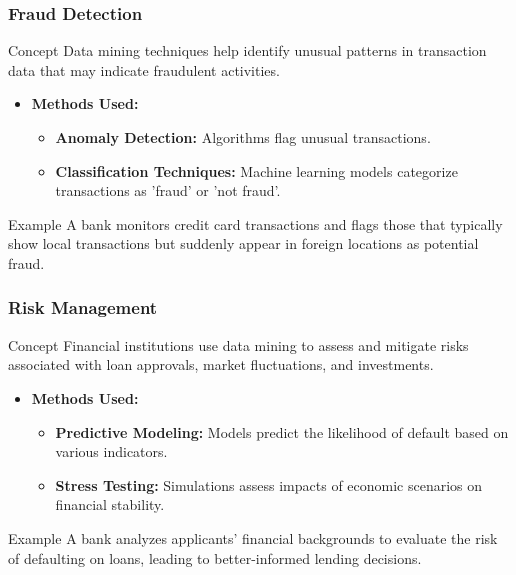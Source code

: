 \documentclass{beamer}
\begin{document}
\begin{frame}[fragile]
    \frametitle{Fraud Detection}
    \begin{block}{Concept}
        Data mining techniques help identify unusual patterns in transaction data that may indicate fraudulent activities.
    \end{block}
    \begin{itemize}
        \item \textbf{Methods Used:}
        \begin{itemize}
            \item \textbf{Anomaly Detection:} Algorithms flag unusual transactions.
            \item \textbf{Classification Techniques:} Machine learning models categorize transactions as 'fraud' or 'not fraud'.
        \end{itemize}
    \end{itemize}
    \begin{block}{Example}
        A bank monitors credit card transactions and flags those that typically show local transactions but suddenly appear in foreign locations as potential fraud.
    \end{block}
\end{frame}

\begin{frame}[fragile]
    \frametitle{Risk Management}
    \begin{block}{Concept}
        Financial institutions use data mining to assess and mitigate risks associated with loan approvals, market fluctuations, and investments.
    \end{block}
    \begin{itemize}
        \item \textbf{Methods Used:}
        \begin{itemize}
            \item \textbf{Predictive Modeling:} Models predict the likelihood of default based on various indicators.
            \item \textbf{Stress Testing:} Simulations assess impacts of economic scenarios on financial stability.
        \end{itemize}
    \end{itemize}
    \begin{block}{Example}
        A bank analyzes applicants' financial backgrounds to evaluate the risk of defaulting on loans, leading to better-informed lending decisions.
    \end{block}
\end{frame}
\end{document}
